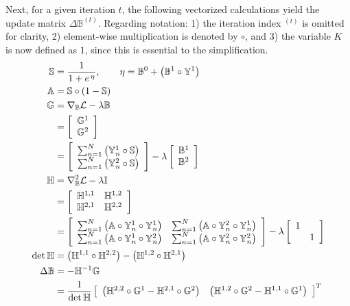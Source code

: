 \documentclass[openany,11pt,vi,oneside]{mitthesis}
\renewcommand{\L}{\mathcal{L}}
\newcommand{\ep}{\circ}
\newcommand{\x}[1]{\mathbb{#1}}
\newcommand{\et}{\thinspace}
\begin{document}
Next, for a given iteration $t$, the following vectorized calculations yield the update matrix $\Delta\x{B}^{(t)}$. Regarding notation: 1) the iteration index ${}^{(t)}$ is omitted for clarity, 2) element-wise multiplication is denoted by $\circ$, and 3) the variable $K$ is now defined as $1$, since this is essential to the simplification.
\begin{align}
\x{S} &= \frac{1}{1+e^{\et\eta}},\qquad \eta = \x{B}^0 + \left(\x{B}^1\ep\x{Y}^1\right)\\
\x{A} &= \x{S}\ep\left(1-\x{S}\right)\\
\x{G} &= \nabla_{\x{B}}\L - \lambda\x{B} \nonumber \\
      &= \left[\begin{array}{c}
           \x{G}^1 \\ \x{G}^2
         \end{array}\right] \nonumber \\
      &= \left[\begin{array}{c}
           \sum_{n=1}^{N}\left( \x{Y}_n^1\circ\x{S} \right) \\
           \sum_{n=1}^{N}\left( \x{Y}_n^2\circ\x{S} \right)
         \end{array}\right] - \lambda\left[\begin{array}{c} \x{B}^1 \\ \x{B}^2\end{array}\right]\\
\x{H} &= \nabla_{\x{B}}^2\L -\lambda\x{I} \nonumber \\
      &= \left[\begin{array}{cc}
           \x{H}^{1,1} & \x{H}^{1,2} \\ \x{H}^{2,1} & \x{H}^{2,2}
         \end{array}\right] \nonumber \\
      &= \left[\begin{array}{cc}
           \sum_{n=1}^{N}\left( \x{A}\circ\x{Y}_n^1\circ\x{Y}_n^1 \right) & 
           \sum_{n=1}^{N}\left( \x{A}\circ\x{Y}_n^2\circ\x{Y}_n^1 \right) \\
           \sum_{n=1}^{N}\left( \x{A}\circ\x{Y}_n^1\circ\x{Y}_n^2 \right) & 
           \sum_{n=1}^{N}\left( \x{A}\circ\x{Y}_n^2\circ\x{Y}_n^2 \right)
         \end{array}\right] - \lambda\left[\begin{array}{cc} 1 & \\ & 1\end{array}\right]\\
\det{\x{H}} &= \left(\x{H}^{1,1}\circ\x{H}^{2,2}\right) - \left(\x{H}^{1,2}\circ\x{H}^{2,1}\right) \\
\Delta\x{B} &= -\x{H}^{-1}\x{G} \nonumber \\
      &= \dfrac{1}{\det{\x{H}}} \left[\begin{array}{cc}
           \left(\x{H}^{2,2}\circ\x{G}^{1} - \x{H}^{2,1}\circ\x{G}^{2} \right) & 
           \left(\x{H}^{1,2}\circ\x{G}^{2} - \x{H}^{1,1}\circ\x{G}^{1} \right)
         \end{array}\right]^{T}
\end{align}
\end{document}
